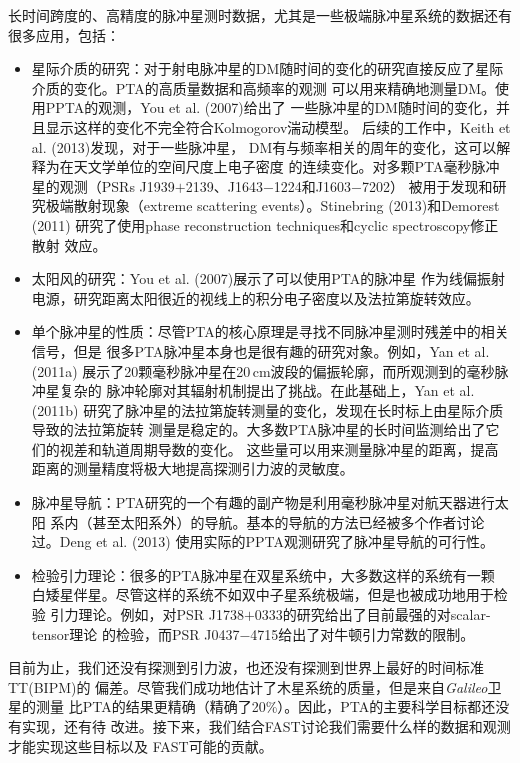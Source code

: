 长时间跨度的、高精度的脉冲星测时数据，尤其是一些极端脉冲星系统的数据还有
很多应用，包括：
\begin{itemize}
\item 星际介质的研究：对于射电脉冲星的DM随时间的变化的研究直接反应了星际
介质的变化。PTA的高质量数据和高频率的观测
可以用来精确地测量DM。使用PPTA的观测，You et al. (2007)\supercite{yhc+07}给出了
一些脉冲星的DM随时间的变化，并且显示这样的变化不完全符合Kolmogorov湍动模型。
后续的工作中，Keith et al. (2013)\supercite{Keith13}发现，对于一些脉冲星，
DM有与频率相关的周年的变化，这可以解释为在天文学单位的空间尺度上电子密度
的连续变化。对多颗PTA毫秒脉冲星的观测（PSRs J1939$+$2139、J1643$-$1224和J1603$-$7202） 
\supercite{cbl+93,mlc03,Keith13}被用于发现和研究极端散射现象（extreme 
scattering events）。Stinebring (2013)\supercite{sti13}和Demorest (2011)\supercite{dem11}
研究了使用phase reconstruction techniques和cyclic spectroscopy修正散射
效应。
\item 太阳风的研究：You et al. (2007)\supercite{yhc+07}展示了可以使用PTA的脉冲星
作为线偏振射电源，研究距离太阳很近的视线上的积分电子密度以及法拉第旋转效应。
\item 单个脉冲星的性质：尽管PTA的核心原理是寻找不同脉冲星测时残差中的相关信号，但是
很多PTA脉冲星本身也是很有趣的研究对象。例如，Yan et al. (2011a)\supercite{Yan11a}
展示了20颗毫秒脉冲星在20\,cm波段的偏振轮廓，而所观测到的毫秒脉冲星复杂的
脉冲轮廓对其辐射机制提出了挑战。在此基础上，Yan et al. (2011b)\supercite{Yan11b}
研究了脉冲星的法拉第旋转测量的变化，发现在长时标上由星际介质导致的法拉第旋转
测量是稳定的。大多数PTA脉冲星的长时间监测给出了它们的视差和轨道周期导数的变化。
这些量可以用来测量脉冲星的距离，提高距离的测量精度将极大地提高探测引力波的灵敏度。
\item 脉冲星导航：PTA研究的一个有趣的副产物是利用毫秒脉冲星对航天器进行太阳
系内（甚至太阳系外）的导航。基本的导航的方法已经被多个作者讨论过。Deng et al. (2013)
\supercite{dhy+13}使用实际的PPTA观测研究了脉冲星导航的可行性。
\item 检验引力理论：很多的PTA脉冲星在双星系统中，大多数这样的系统有一颗
白矮星伴星。尽管这样的系统不如双中子星系统极端，但是也被成功地用于检验
引力理论。例如，对PSR J1738$+$0333的研究给出了目前最强的对scalar-tensor理论
的检验\supercite{fwe+12}，而PSR J0437$-$4715给出了对牛顿引力常数的限制\supercite{vbv+08}。
\end{itemize}

目前为止，我们还没有探测到引力波，也还没有探测到世界上最好的时间标准TT(BIPM)的
偏差。尽管我们成功地估计了木星系统的质量，但是来自\emph{Galileo}卫星的测量
比PTA的结果更精确（精确了20\%）。因此，PTA的主要科学目标都还没有实现，还有待
改进。接下来，我们结合FAST讨论我们需要什么样的数据和观测才能实现这些目标以及
FAST可能的贡献。

